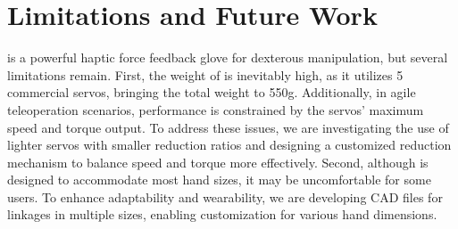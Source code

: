\section{Limitations and Future Work}

\oursystem is a powerful haptic force feedback glove for dexterous manipulation, but several limitations remain.
%
First, the weight of \oursystem is inevitably high, as it utilizes 5 commercial servos, bringing the total weight to 550g. Additionally, in agile teleoperation scenarios, performance is constrained by the servos' maximum speed and torque output.
%
To address these issues, we are investigating the use of lighter servos with smaller reduction ratios and designing a customized reduction mechanism to balance speed and torque more effectively.
%
Second, although \oursystem is designed to accommodate most hand sizes, it may be uncomfortable for some users. 
%
To enhance adaptability and wearability, we are developing CAD files for linkages in multiple sizes, enabling customization for various hand dimensions.
